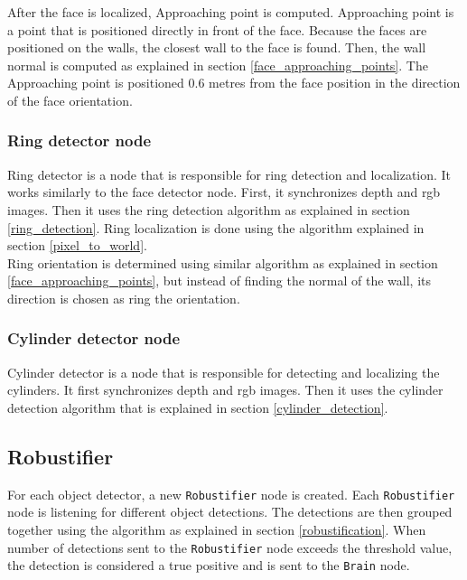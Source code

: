 \documentclass[12pt,a4paper]{article}
\begin{document}
	After the face is localized, Approaching point is computed. Approaching point is a point that is positioned directly in front of the face. Because the faces are positioned on the walls, the closest wall to the face is found. Then, the wall normal is computed as explained in section \ref{face_approaching_points}. The Approaching point is positioned 0.6 metres from the face position in the direction of the face orientation. \\

	\subsubsection{Ring detector node}
	Ring detector is a node that is responsible for ring detection and localization. It works similarly to the face detector node. First, it synchronizes depth and rgb images. Then it uses the ring detection algorithm as explained in section \ref{ring_detection}. Ring localization is done using the algorithm explained in section \ref{pixel_to_world}. \\
	
	Ring orientation is determined using similar algorithm as explained in section \ref{face_approaching_points}, but instead of finding the normal of the wall, its direction is chosen as ring the orientation. \\
	
	\subsubsection{Cylinder detector node}
	Cylinder detector is a node that is responsible for detecting and localizing the cylinders. It first synchronizes depth and rgb images. Then it uses the cylinder detection algorithm that is explained in section \ref{cylinder_detection}. \\

	\subsection{Robustifier}
	For each object detector, a new \texttt{Robustifier} node is created. Each \texttt{Robustifier} node is listening for different object detections. The detections are then grouped together using the algorithm as explained in section \ref{robustification}. When number of detections sent to the \texttt{Robustifier} node exceeds the threshold value, the detection is considered a true positive and is sent to the \texttt{Brain} node. \\
	
\end{document}
